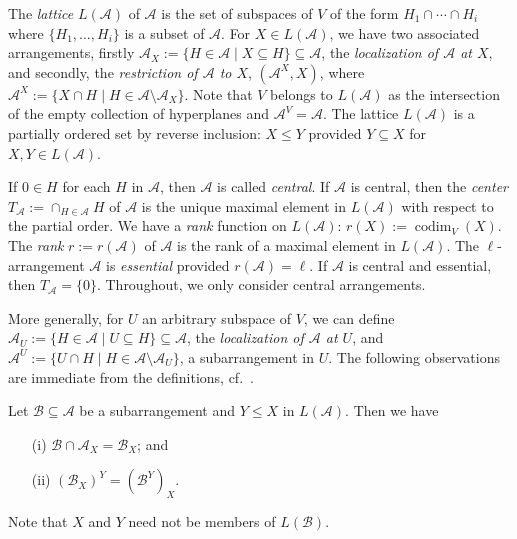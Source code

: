 The \emph{lattice} $L({{\mathcal A}})$ of ${{\mathcal A}}$ is the set of subspaces of $V$ of
the form $H_1\cap \dotsm \cap H_i$ where $\{ H_1, \ldots, H_i\}$ is a subset
of ${{\mathcal A}}$. 
For $X \in L({{\mathcal A}})$, we have two associated arrangements, 
firstly
${{\mathcal A}}_X :=\{H \in {{\mathcal A}} \mid X \subseteq H\} \subseteq {{\mathcal A}}$,
the \emph{localization of ${{\mathcal A}}$ at $X$}, 
and secondly, 
the \emph{restriction of ${{\mathcal A}}$ to $X$}, $({{\mathcal A}}^X,X)$, where 
${{\mathcal A}}^X := \{ X \cap H \mid H \in {{\mathcal A}} \setminus {{\mathcal A}}_X\}$.
Note that $V$ belongs to $L({{\mathcal A}})$
as the intersection of the empty 
collection of hyperplanes and ${{\mathcal A}}^V = {{\mathcal A}}$. 
The lattice $L({{\mathcal A}})$ is a partially ordered set by reverse inclusion:
$X \le Y$ provided $Y \subseteq X$ for $X,Y \in L({{\mathcal A}})$.

If $0 \in H$ for each $H$ in ${{\mathcal A}}$, then 
${{\mathcal A}}$ is called \emph{central}.
If ${{\mathcal A}}$ is central, then the \emph{center} 
$T_{{\mathcal A}} := \cap_{H \in {{\mathcal A}}} H$ of ${{\mathcal A}}$ is the unique
maximal element in $L({{\mathcal A}})$  with respect
to the partial order.
We have a \emph{rank} function on $L({{\mathcal A}})$: $r(X) := {\operatorname{codim}}_V(X)$.
The \emph{rank} $r := r({{\mathcal A}})$ of ${{\mathcal A}}$ 
is the rank of a maximal element in $L({{\mathcal A}})$.
The $\ell$-arrangement ${{\mathcal A}}$ is \emph{essential} 
provided $r({{\mathcal A}}) = \ell$.
If ${{\mathcal A}}$ is central and essential, then $T_{{\mathcal A}} =\{0\}$.
Throughout, we only consider central arrangements.

More generally, for $U$ an arbitrary subspace of $V$, we can define  
${{\mathcal A}}_U :=\{H \in {{\mathcal A}} \mid U \subseteq H\} \subseteq {{\mathcal A}}$, the 
\emph{localization of ${{\mathcal A}}$ at $U$}, 
and 
${{\mathcal A}}^U := \{ U \cap H \mid H \in {{\mathcal A}} \setminus {{\mathcal A}}_U\}$,
a subarrangement in $U$.
The following observations are immediate
from the definitions, cf.~\cite[\S 2]{orlikterao:arrangements}.

\begin{lemma}
\label{lem:swap}
Let ${{\mathcal B}} \subseteq {{\mathcal A}}$ be a subarrangement and 
$Y \le X$ in  $L({{\mathcal A}})$.
Then we have
\begin{itemize}
\item[(i)]
${{\mathcal B}} \cap {{\mathcal A}}_X = {{\mathcal B}}_X$; and
\item[(ii)]
$({{\mathcal B}}_X)^Y = ({{\mathcal B}}^Y)_X$.
\end{itemize}
Note that $X$ and $Y$ need not be members of $L({{\mathcal B}})$.
\end{lemma}

